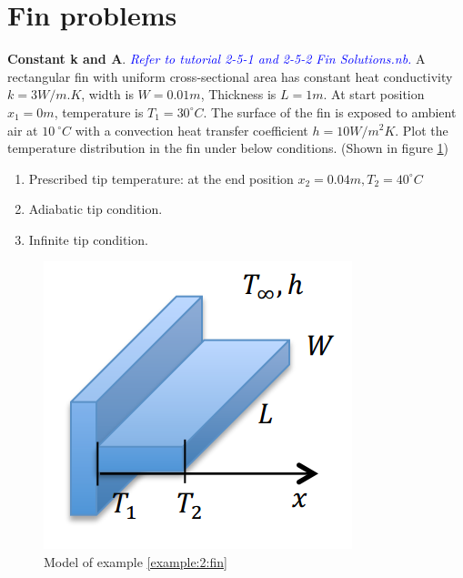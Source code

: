 \section{Fin problems}
\begin{example}
\label{example:2:fin}
\textbf{Constant k and A}. 
\textcolor{blue} {\emph{Refer to tutorial 2-5-1 and 2-5-2 Fin Solutions.nb.}}
A rectangular fin with uniform cross-sectional area has constant heat conductivity
$k=3W/m.K$, width is $W=0.01m$, Thickness is $L=1m$. At start position $x_1=0m$, temperature is $T_1=30^\circ C$. The surface of the fin is exposed to ambient air at $10~^\circ C$ with a convection heat transfer coefficient $h=10W/m^2K$.
Plot the temperature distribution in the fin under below conditions. (Shown in figure \ref{fig:2:12})
\begin{enumerate}
\item Prescribed tip temperature: at the end position $x_2=0.04m, T_2=40^\circ C$
\item Adiabatic tip condition.
\item Infinite tip condition.
\end{enumerate}
\begin{figure}[H]
  \centering
    \includegraphics[scale=0.6]{figures/ch2/12}
    \caption{Model of example \ref{example:2:fin}}
    \label{fig:2:12}
\end{figure}
\end{example}


